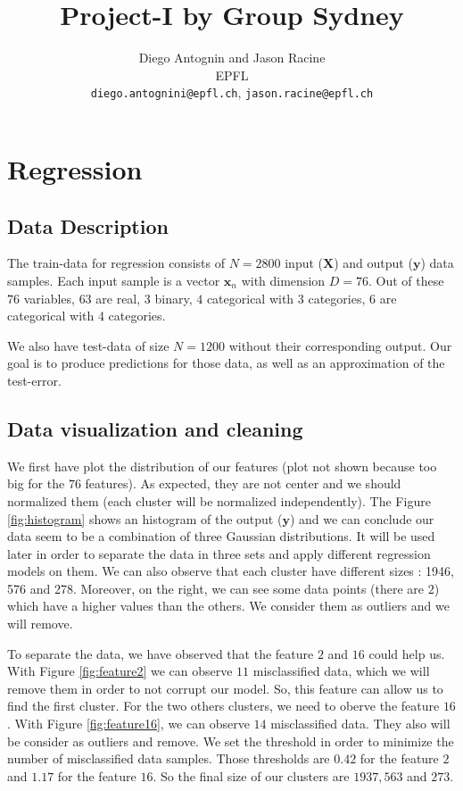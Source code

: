 \documentclass{article} %
\title{Project-I by Group Sydney}
\author{
Diego Antognin and Jason Racine \\
EPFL \\
\texttt{diego.antognini@epfl.ch}, \texttt{jason.racine@epfl.ch} \\
}
\begin{document}
\maketitle

\begin{abstract}

\end{abstract}

\section{Regression}

\subsection{Data Description}

The train-data for regression consists of $N = 2800$ input ($\mathbf{X}$) and output ($\mathbf{y}$) data samples. Each input sample is a vector $\mathbf{x}_n$ with dimension $D = 76$. Out of these $76$ variables, $63$ are real, $3$ binary, $4$ categorical with 3 categories, $6$ are categorical with 4 categories.

We also have test-data of size $N=1200$ without their corresponding output. Our goal is to produce predictions for those data, as well as an approximation of the test-error.

\subsection{Data visualization and cleaning}

We first have plot the distribution of our features (plot not shown because too big for the $76$ features). As expected, they are not center and we should normalized them (each cluster will be normalized independently). The Figure \ref{fig:histogram} shows an histogram of the output ($\mathbf{y}$) and we can conclude our data  seem to be a combination of three Gaussian distributions. It will be used later in order to separate the data in three sets and apply different regression models on them. We can also observe that each cluster have different sizes : 1946, 576 and 278. Moreover, on the right, we can see some data points (there are $2$) which have a higher values than the others. We consider them as outliers and we will remove.

To separate the data, we have observed that the feature $2$ and $16$ could help us. With Figure \ref{fig:feature2} we can observe $11$ misclassified data, which we will remove them in order to not corrupt our model.  So, this feature can allow us to find the first cluster. For the two others clusters, we need to oberve the feature $16$. With Figure \ref{fig:feature16}, we can observe $14$ misclassified data. They also will be consider as outliers and remove. We set the threshold in order to minimize the number of misclassified data samples. Those thresholds are $0.42$ for the feature $2$ and $1.17$ for the feature $16$. So the final size of our clusters are $1937, 563$ and $273$.
\end{document}
